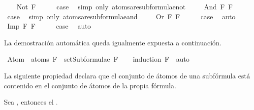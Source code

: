 \begin{isabellebody}
\isanewline
\ \ \isamarkupfalse%
\ {\isacharparenleft}Not\ F{\isacharparenright}\isanewline
\ \ \isamarkupfalse%
\ \isamarkupfalse%
\ {\isacharquery}case\ \isamarkupfalse%
\ {\isacharparenleft}simp\ only{\isacharcolon}\ atoms{\isacharunderscore}are{\isacharunderscore}subformulae{\isacharunderscore}not{\isacharparenright}\ \isanewline
{}\isamarkupfalse%
\isanewline
\ \ \isamarkupfalse%
\ {\isacharparenleft}And\ F{}\ F{}{\isacharparenright}\isanewline
\ \ \isamarkupfalse%
\ \isamarkupfalse%
\ {\isacharquery}case\ \isamarkupfalse%
\ {\isacharparenleft}simp\ only{\isacharcolon}\ atoms{\isacharunderscore}are{\isacharunderscore}subformulae{\isacharunderscore}and{\isacharparenright}\ \isanewline
{}\isamarkupfalse%
\isanewline
\ \ \isamarkupfalse%
\ {\isacharparenleft}Or\ F{}\ F{}{\isacharparenright}\isanewline
\ \ \isamarkupfalse%
\ \isamarkupfalse%
\ {\isacharquery}case\ \isamarkupfalse%
\ auto\isanewline
{}\isamarkupfalse%
\isanewline
\ \ \isamarkupfalse%
\ {\isacharparenleft}Imp\ F{}\ F{}{\isacharparenright}\isanewline
\ \ \isamarkupfalse%
\ \isamarkupfalse%
\ {\isacharquery}case\ \isamarkupfalse%
\ auto\isanewline
{}\isamarkupfalse%
%
\endisatagproof
{\isafoldproof}%
%
\isadelimproof
%
\endisadelimproof
%
\begin{isamarkuptext}%
La demostración automática queda igualmente expuesta a 
  continuación.%
\end{isamarkuptext}\isamarkuptrue%
\isamarkupfalse%
\ {\isachardoublequoteopen}Atom\ {\isacharbackquote}\ atoms\ F\ {\isasymsubseteq}\ setSubformulae\ F{\isachardoublequoteclose}\isanewline
%
\isadelimproof
\ \ %
\endisadelimproof
%
\isatagproof
{}\isamarkupfalse%
\ {\isacharparenleft}induction\ F{\isacharparenright}\ \ auto%
\endisatagproof
{\isafoldproof}%
%
\isadelimproof
%
\endisadelimproof
%
\begin{isamarkuptext}%
La siguiente propiedad declara que el conjunto de átomos de una 
  subfórmula está contenido en el conjunto de átomos de la propia 
  fórmula.
  \begin{lema}
    Sea , entonces el .
  \end{lema}


\end{isamarkuptext}
\end{isabellebody}
